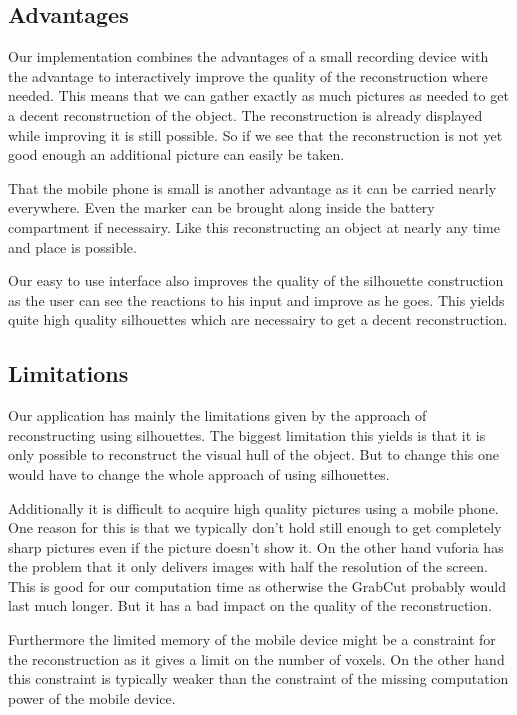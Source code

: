 \documentclass[10pt,twocolumn,letterpaper]{article}
\begin{document}
\subsection{Advantages}

Our implementation combines the advantages of a small recording device with the advantage to interactively improve the quality of the reconstruction where needed. This means that we can gather exactly as much pictures as needed to get a decent reconstruction of the object. The reconstruction is already displayed while improving it is still possible. So if we see that the reconstruction is not yet good enough an additional picture can easily be taken.

That the mobile phone is small is another advantage as it can be carried nearly everywhere. Even the marker can be brought along inside the battery compartment if necessairy. Like this reconstructing an object at nearly any time and place is possible.

Our easy to use interface also improves the quality of the silhouette construction as the user can see the reactions to his input and improve as he goes. This yields quite high quality silhouettes which are necessairy to get a decent reconstruction.

\subsection{Limitations}

Our application has mainly the limitations given by the approach of reconstructing using silhouettes. The biggest limitation this yields is that it is only possible to reconstruct the visual hull of the object. But to change this one would have to change the whole approach of using silhouettes.

Additionally it is difficult to acquire high quality pictures using a mobile phone. One reason for this is that we typically don't hold still enough to get completely sharp pictures even if the picture doesn't show it. On the other hand vuforia has the problem that it only delivers images with half the resolution of the screen. This is good for our computation time as otherwise the GrabCut probably would last much longer. But it has a bad impact on the quality of the reconstruction.

Furthermore the limited memory of the mobile device might be a constraint for the reconstruction as it gives a limit on the number of voxels. On the other hand this constraint is typically weaker than the constraint of the missing computation power of the mobile device.
\end{document}
